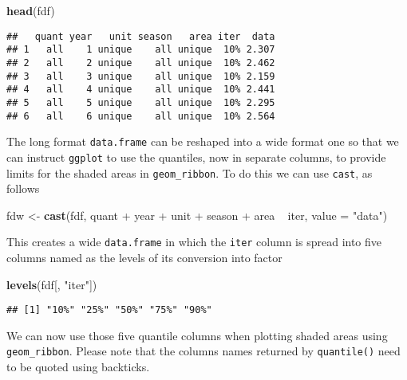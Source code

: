 \documentclass{tufte-handout}
\newenvironment{Shaded}{}{}
\newcommand{\KeywordTok}[1]{\textcolor[rgb]{0.00,0.44,0.13}{\textbf{{#1}}}}
\newcommand{\DataTypeTok}[1]{\textcolor[rgb]{0.56,0.13,0.00}{{#1}}}
\newcommand{\StringTok}[1]{\textcolor[rgb]{0.25,0.44,0.63}{{#1}}}
\newcommand{\NormalTok}[1]{{#1}}
\begin{document}
\begin{Shaded}
\begin{Highlighting}[]
\KeywordTok{head}\NormalTok{(fdf)}
\end{Highlighting}
\end{Shaded}
\begin{verbatim}
##   quant year   unit season   area iter  data
## 1   all    1 unique    all unique  10% 2.307
## 2   all    2 unique    all unique  10% 2.462
## 3   all    3 unique    all unique  10% 2.159
## 4   all    4 unique    all unique  10% 2.441
## 5   all    5 unique    all unique  10% 2.295
## 6   all    6 unique    all unique  10% 2.564
\end{verbatim}
The long format \texttt{data.frame} can be reshaped into a wide format
one so that we can instruct \texttt{ggplot} to use the quantiles, now in
separate columns, to provide limits for the shaded areas in
\texttt{geom\_ribbon}. To do this we can use \texttt{cast}, as follows

\begin{Shaded}
\begin{Highlighting}[]
\NormalTok{fdw <- }\KeywordTok{cast}\NormalTok{(fdf, quant + year + unit + season + area ~ }
    \NormalTok{iter, }\DataTypeTok{value =} \StringTok{"data"}\NormalTok{)}
\end{Highlighting}
\end{Shaded}
This creates a wide \texttt{data.frame} in which the \texttt{iter}
column is spread into five columns named as the levels of its conversion
into factor

\begin{Shaded}
\begin{Highlighting}[]
\KeywordTok{levels}\NormalTok{(fdf[, }\StringTok{"iter"}\NormalTok{])}
\end{Highlighting}
\end{Shaded}
\begin{verbatim}
## [1] "10%" "25%" "50%" "75%" "90%"
\end{verbatim}
We can now use those five quantile columns when plotting shaded areas
using \texttt{geom\_ribbon}. Please note that the columns names returned
by \texttt{quantile()} need to be quoted using backticks.
\end{document}
